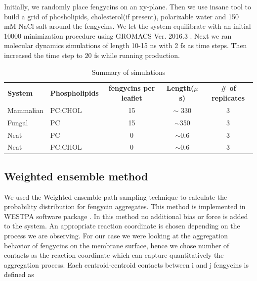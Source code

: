 Initially, we randomly place fengycins on an xy-plane. Then we use insane tool to build a grid of phosholipids, cholesterol(if present), polarizable water and 150 mM NaCl salt around the fengycins\cite{Marrink2015}.
We let the system equilibrate with an initial 10000 minimization procedure using GROMACS Ver. 2016.3 \cite{Lindahl2015}.
Next we ran molecular dynamics simulations of length 10-15 ns with 2 fs as time steps.
Then increased the time step to 20 fs while running production.

\begin{table}[h!]
  \caption{Summary of simulations}
  \label{t:sys_cons}
  \begin{tabular}{llccc}
    \hline
    \textbf{System}  & \textbf{Phospholipids} & \textbf{fengycins per leaflet} & \textbf{Length($\mu$s)} & \textbf{\# of replicates} \\
    Mammalian   & PC:CHOL & 15 & $\sim$ 330  & 3 \\
    Fungal & PC  & 15 & $\sim$350 & 3\\
    Neat  & PC & 0 & $\sim$0.6 & 3\\
    Neat & PC:CHOL & 0 & $\sim$0.6 &3\\
    \hline
  \end{tabular}
\end{table}

\subsection{Weighted ensemble method}
\label{ss:we_method}
We used the Weighted ensemble path sampling technique to calculate the probability distribution for fengycin aggregates. This method is implemented in WESTPA software package \cite{WESTPA2015,WESTPA_github}.
In this method no additional bias or force is added to the system. An appropriate reaction coordinate is chosen
depending on the process we are observing. For our case we were looking at the aggregation behavior of fengycins
on the membrane surface, hence we chose number of contacts as the reaction coordinate which can capture quantitatively
the aggregation process. Each centroid-centroid contacts between i and j fengycins is defined as

